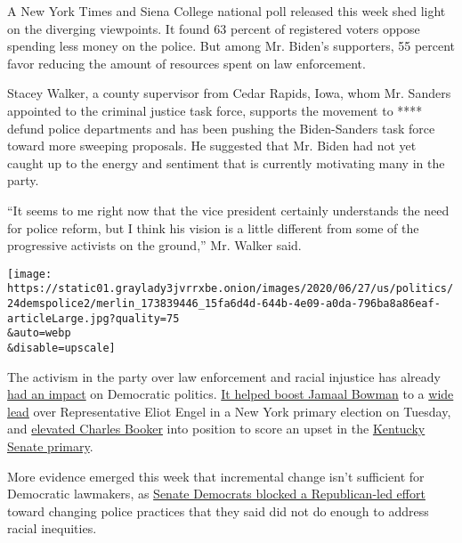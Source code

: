 A New York Times and Siena College national poll released this week shed
light on the diverging viewpoints. It found 63 percent of registered
voters oppose spending less money on the police. But among Mr. Biden's
supporters, 55 percent favor reducing the amount of resources spent on
law enforcement.

Stacey Walker, a county supervisor from Cedar Rapids, Iowa, whom Mr.
Sanders appointed to the criminal justice task force, supports the
movement to **** defund police departments and has been pushing the
Biden-Sanders task force toward more sweeping proposals. He suggested
that Mr. Biden had not yet caught up to the energy and sentiment that is
currently motivating many in the party.

``It seems to me right now that the vice president certainly understands
the need for police reform, but I think his vision is a little different
from some of the progressive activists on the ground,'' Mr. Walker said.

\texttt{[image: https://static01.graylady3jvrrxbe.onion/images/2020/06/27/us/politics/24demspolice2/merlin\_173839446\_15fa6d4d-644b-4e09-a0da-796ba8a86eaf-articleLarge.jpg?quality=75\\\&auto=webp\\\&disable=upscale]}

The activism in the party over law enforcement and racial injustice has
already
\href{https://www.nytimes3xbfgragh.onion/2020/06/26/us/politics/charles-booker-kentucky-jamaal-bowman.html}{had
an impact} on Democratic politics.
\href{https://www.nytimes3xbfgragh.onion/2020/06/24/nyregion/ny-primary-election-results.html}{It
helped boost Jamaal Bowman} to a
\href{https://www.nytimes3xbfgragh.onion/interactive/2020/06/23/us/elections/results-new-york-house-district-16-primary-election.html}{wide
lead} over Representative Eliot Engel in a New York primary election on
Tuesday, and
\href{https://www.nytimes3xbfgragh.onion/2020/06/23/us/politics/kentucky-new-york-election-recap.html}{elevated
Charles Booker} into position to score an upset in the
\href{https://www.nytimes3xbfgragh.onion/interactive/2020/06/23/us/elections/results-kentucky-senate-primary-election.html}{Kentucky
Senate primary}.

More evidence emerged this week that incremental change isn't sufficient
for Democratic lawmakers, as
\href{https://www.nytimes3xbfgragh.onion/2020/06/24/us/politics/senate-police-bill.html}{Senate
Democrats blocked a Republican-led effort} toward changing police
practices that they said did not do enough to address racial inequities.

